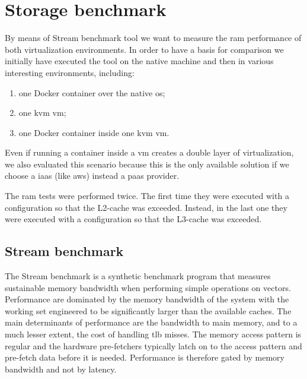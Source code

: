 %
%
\section{Storage benchmark}
\label{sec:measurements-storage}
By means of Stream benchmark tool we want to measure the \acs{ram} performance of both virtualization
environments. In order to have a basis for comparison we initially have executed the tool on the native
machine and then in various interesting environments, including:

\begin{enumerate}
	\item{one Docker container over the native \acs{os};}
	\item{one \ac{kvm} \ac{vm};}
	\item{one Docker container inside one \ac{kvm} \ac{vm}.}
\end{enumerate}

Even if running a container inside a \ac{vm} creates a double layer of virtualization, we also evaluated
this scenario because this is the only available solution if we choose a \ac{iaas} (like \ac{aws}) instead
a \ac{paas} provider.

The \acs{ram} tests were performed twice. The first time they were executed with a configuration so that
the L2-cache was exceeded. Instead, in the last one they were executed with a configuration so that the
L3-cache was exceeded.

\subsection{Stream benchmark}
\label{sec:measurements-storage-stream}
The Stream benchmark \cite{streamBenchmark} is a synthetic benchmark program that measures sustainable
memory bandwidth when performing simple operations on vectors. Performance are dominated by the memory
bandwidth of the system with the working set engineered to be significantly larger than the available
caches. The main determinants of performance are the bandwidth to main memory, and to a much lesser
extent, the cost of handling \ac{tlb} misses. The memory access pattern is regular and the hardware
pre-fetchers typically latch on to the access pattern and pre-fetch data before it is needed. Performance
is therefore gated by memory bandwidth and not by latency.


